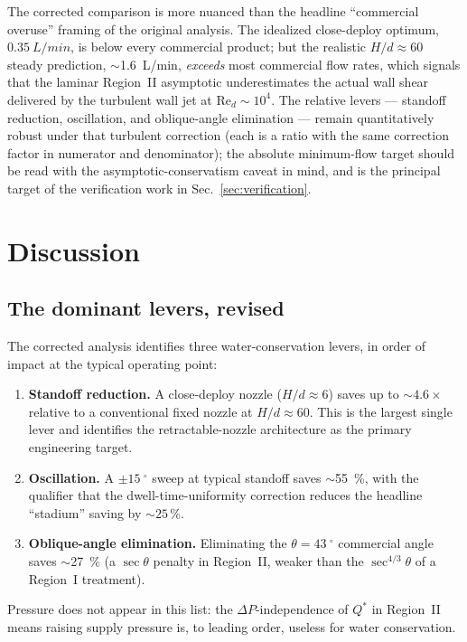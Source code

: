 \documentclass[10pt,letterpaper]{article}
\newcommand{\Rey}{\mathrm{Re}}
\begin{document}
The corrected comparison is more nuanced than the headline ``commercial
overuse'' framing of the original analysis. The idealized close-deploy
optimum, $0.35~L/min$, is below every commercial product; but the
realistic $H/d \approx 60$ steady prediction, $\sim$1.6~L/min,
\emph{exceeds} most commercial flow rates, which signals that
the laminar Region~II asymptotic underestimates the actual wall shear
delivered by the turbulent wall jet at $\Rey_d \sim 10^4$. The relative
levers --- standoff reduction, oscillation, and oblique-angle
elimination --- remain quantitatively robust under that turbulent
correction (each is a ratio with the same correction factor in
numerator and denominator); the absolute minimum-flow target should
be read with the asymptotic-conservatism caveat in mind, and is
the principal target of the verification work in
Sec.~\ref{sec:verification}.

\section{Discussion}
\label{sec:discussion}

\subsection{The dominant levers, revised}

The corrected analysis identifies three water-conservation levers, in
order of impact at the typical operating point:
\begin{enumerate}[leftmargin=*]
  \item \textbf{Standoff reduction.} A close-deploy nozzle ($H/d \approx 6$)
  saves up to $\sim 4.6\times$ relative to a conventional fixed nozzle at
  $H/d \approx 60$. This is the largest single lever and identifies the
  retractable-nozzle architecture as the primary engineering target.
  \item \textbf{Oscillation.} A $\pm15~^\circ $ sweep at typical
  standoff saves $\sim$55~\%, with the qualifier that the
  dwell-time-uniformity correction reduces the headline ``stadium''
  saving by $\sim 25$\,\%.
  \item \textbf{Oblique-angle elimination.} Eliminating the
  $\theta = 43~^\circ $ commercial angle saves
  $\sim$27~\% (a $\sec\theta$ penalty in Region~II, weaker
  than the $\sec^{4/3}\theta$ of a Region~I treatment).
\end{enumerate}
Pressure does not appear in this list: the $\Delta P$-independence of
$Q^*$ in Region~II means raising supply pressure is, to leading order,
useless for water conservation.
\end{document}
